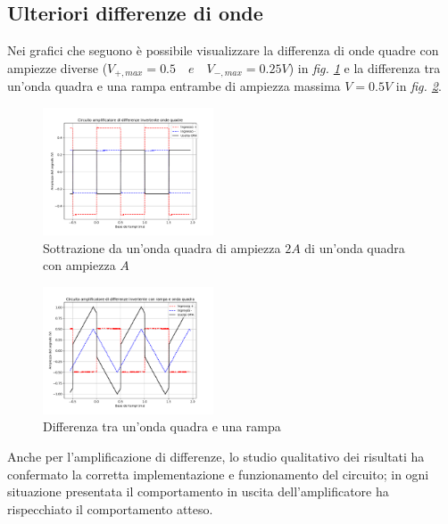 \documentclass[journal]{IEEEtran}
\begin{document}
\subsection{Ulteriori differenze di onde}
Nei grafici che seguono è possibile visualizzare la differenza di onde quadre con ampiezze diverse ($V_{+,max} = 0.5 \quad e \quad V_{-,max} = 0.25V$) in \textit{fig. \ref{fig:diff_square}}
e la differenza tra un'onda quadra e una rampa entrambe di ampiezza massima $V=0.5V$ in \textit{fig. \ref{fig:diff_squareramp}}.

\begin{figure}[H]%
\begin {center}
\includegraphics[width=0.45\textwidth]{analysis/output/OPA_diff_square.pdf}
\caption{Sottrazione da un'onda quadra di ampiezza $2A$ di un'onda quadra con ampiezza $A$}
\label{fig:diff_square}
\end {center}
\end{figure}

\begin{figure}[H]%
\begin {center}
\includegraphics[width=0.45\textwidth]{analysis/output/OPA_diff_squareramp.pdf}
\caption{Differenza tra un'onda quadra e una rampa}
\label{fig:diff_squareramp}
\end {center}
\end{figure}

Anche per l'amplificazione di differenze, lo studio qualitativo dei risultati ha confermato la corretta implementazione e funzionamento del circuito; in ogni situazione presentata il comportamento in uscita dell'amplificatore ha rispecchiato il comportamento atteso.
\end{document}
